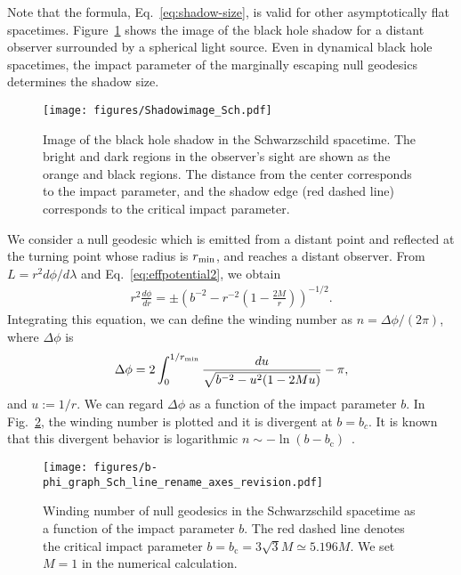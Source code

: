 \documentclass[prd,showpacs,preprintnumbers,groupedaddress,superscriptaddress,nofootinbib,11pt]{revtex4-1} %
\theoremstyle{newplain}
\begin{document}
Note that the formula, Eq.~\eqref{eq:shadow-size}, is valid for other asymptotically flat spacetimes.
Figure~\ref{fig:Shadowimage_Sch} shows the image of the black hole shadow for a distant observer surrounded by a spherical light source.
Even in dynamical black hole spacetimes, the impact parameter of the marginally escaping null geodesics determines the shadow size.
\begin{figure}[t]
    \texttt{[image: figures/Shadowimage\_Sch.pdf]}
    \caption{Image of the black hole shadow in the Schwarzschild spacetime. The bright and dark regions in the observer's sight are shown as the orange and black regions. The distance from the center corresponds to the impact parameter, and the shadow edge (red dashed line) corresponds to the critical impact parameter.
    }
    \label{fig:Shadowimage_Sch}
\end{figure}

We consider a null geodesic which is emitted from a distant point and
reflected at the turning point whose radius is $r_{\rm min}$,
and reaches a distant observer.
From $L = r^2 d\phi/d\lambda$ and Eq.~\eqref{eq:effpotential2}, we obtain
\begin{align}
r^2 \frac{d\phi}{dr} = \pm \left(b^{-2} - r^{-2}\left(1-\frac{2M}{r}\right)\right)^{-1/2}.
\end{align}
Integrating this equation, we can define the winding number as
$n = \Delta \phi/(2\pi)$, where $\Delta \phi$ is
\begin{align}
\Delta \phi
=
2 \int_0^{1/r_{\rm min}} \frac{du}{\sqrt{b^{-2} - u^2(1- 2 M u)}} -\pi,
\end{align}
and $u := 1/r$.
We can regard $\Delta \phi$ as a function of the impact parameter $b$.
In Fig.~\ref{fig:deltaphi_Sch}, the winding number is plotted and
it is divergent at $b = b_{c}$.
It is known that this divergent behavior is logarithmic $n \sim -\ln(b-b_\text{c})$~\cite{1959RSPSA.249..180D, Luminet:1979nyg, Bozza:2002zj}.

\begin{figure}[t]
    \texttt{[image: figures/b-phi\_graph\_Sch\_line\_rename\_axes\_revision.pdf]}
    \caption{Winding number of null geodesics in the Schwarzschild spacetime as a function of the impact parameter $b$. 
    The red dashed line denotes the critical impact parameter $b = b_\text{c} = 3 \sqrt{3}M \simeq 5.196 M$.
    We set $M = 1$ in the numerical calculation.
    }
    \label{fig:deltaphi_Sch}
\end{figure}
\end{document}
